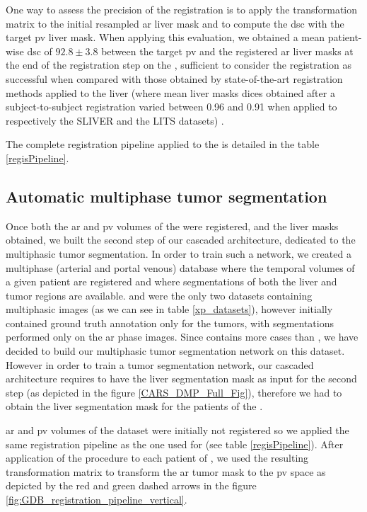 One way to assess the precision of the registration is to apply the
transformation matrix to the initial resampled \ac{ar} liver mask and to
compute the \ac{dsc} with the target \ac{pv} liver mask. When applying this
evaluation, we obtained a mean patient-wise \ac{dsc} of $ 92.8 \pm 3.8 $ between the target \ac{pv} and the registered \ac{ar} liver masks at the
end of the registration step on the \textbf{}, sufficient to consider the
registration as successful when compared with those obtained by state-of-the-art
registration methods applied to the liver (where mean liver masks dices obtained after a subject-to-subject registration varied between 0.96 and 0.91 when applied to respectively the SLIVER and the LITS datasets) \cite{Zhao2019}.

The complete registration pipeline applied to the \textbf{} is detailed in the table \ref{regisPipeline}.

\subsection{Automatic multiphase tumor segmentation}\label{tcia-db-unsupervised-multiphase-tumor-segmentation}

Once both the \ac{ar} and \ac{pv} volumes of the \textbf{} were registered, and the
liver masks obtained, we built the second step of our cascaded
architecture, dedicated to the multiphasic tumor segmentation. In order
to train such a network, we created a multiphase (arterial and portal
venous) database where the temporal volumes of a given patient are
registered and where segmentations of both the liver and tumor regions
are available.
\textbf{} and \textbf{} were the only two datasets containing multiphasic
images (as we can see in table \ref{xp_datasets}), however
\textbf{} initially contained ground truth annotation only for the tumors,
with segmentations performed only on the \ac{ar} phase images.
Since \textbf{} contains more cases than \textbf{}, we have decided to
build our multiphasic tumor segmentation network on this dataset.
However in order to train a tumor segmentation network, our cascaded
architecture requires to have the liver segmentation mask as input for
the second step (as depicted in the figure \ref{CARS_DMP_Full_Fig}), therefore we had to obtain the liver segmentation
mask for the patients of the \textbf{}.

\ac{ar} and \ac{pv} volumes of the \textbf{} dataset were initially not registered so
we applied the same registration pipeline as the one used for \textbf{} (see table \ref{regisPipeline}). After application of the procedure to
each patient of \textbf{}, we used the resulting transformation matrix to
transform the \ac{ar} tumor mask to the \ac{pv} space as depicted by the red and green dashed arrows in the figure \ref{fig:GDB_registration_pipeline_vertical}.



